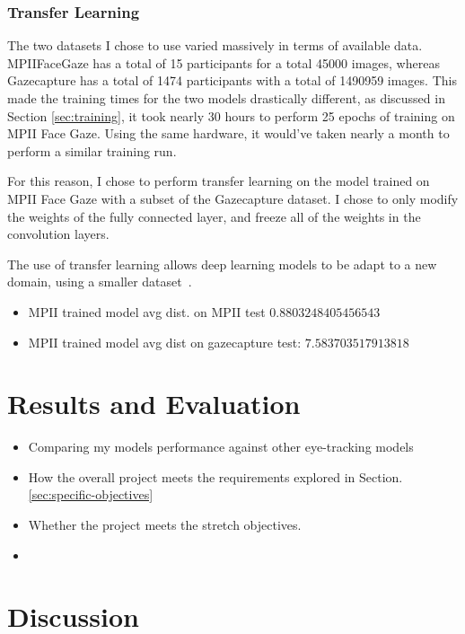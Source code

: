 \documentclass[twocolumn]{report}
\begin{document}
\subsection{Transfer Learning}

The two datasets I chose to use varied massively in terms of available data. MPIIFaceGaze has a total of 15 participants for a total 45000 images, whereas Gazecapture has a total of 1474 participants with a total of 1490959 images. This made the training times for the two models drastically different, as discussed in Section \ref{sec:training}, it took nearly 30 hours to perform 25 epochs of training on MPII Face Gaze. Using the same hardware, it would've taken nearly a month to perform a similar training run. 

For this reason, I chose to perform transfer learning on the model trained on MPII Face Gaze with a subset of the Gazecapture dataset. I chose to only modify the weights of the fully connected layer, and freeze all of the weights in the convolution layers. 

The use of transfer learning allows deep learning models to be adapt to a new domain, using a smaller dataset~\cite{koehrsen2018transfer}. 

\begin{itemize}
    \item MPII trained model avg dist. on MPII test \(0.8803248405456543\)
    \item MPII trained model avg dist on gazecapture test: \(7.583703517913818\)
\end{itemize}


\chapter{Results and Evaluation}

\begin{itemize}
    \item Comparing my models performance against other eye-tracking models
    \item How the overall project meets the requirements explored in Section. \ref{sec:specific-objectives}
    \item Whether the project meets the stretch objectives.
    \item
\end{itemize}

\chapter{Discussion}
\end{document}
